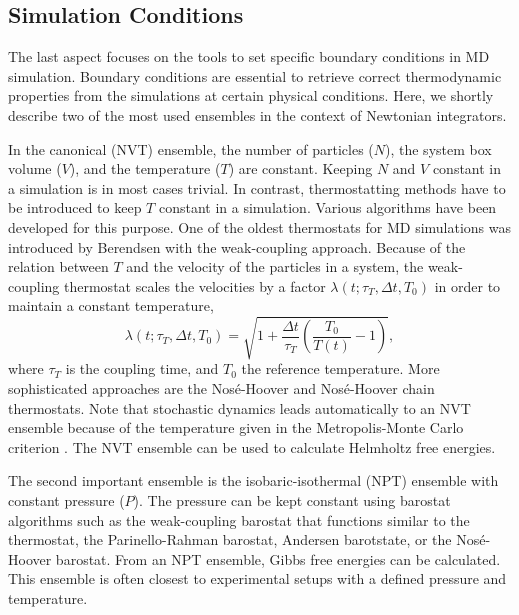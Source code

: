  
\subsection{Simulation Conditions}
The last aspect focuses on the tools to set specific boundary conditions in MD simulation. 
Boundary conditions are essential to retrieve correct thermodynamic properties from the simulations at certain physical conditions. Here, we shortly describe two of the most used ensembles in the context of Newtonian integrators.

In the canonical (NVT) ensemble, the number of particles ($N$), the system box volume ($V$), and the temperature ($T$) are constant. Keeping $N$ and $V$ constant in a simulation is in most cases trivial. In contrast, thermostatting methods have to be introduced to keep $T$ constant in a simulation.  Various algorithms have been developed for this purpose. One of the oldest thermostats for MD simulations was introduced by Berendsen\cite{Berendsen1984} with the weak-coupling approach. Because of the relation between $T$ and the velocity of the particles in a system, the weak-coupling thermostat scales the velocities by a factor $\lambda(t; \tau_T, \Delta t, T_0)$ in order to maintain a constant temperature,  
\begin{equation}
    \lambda(t; \tau_T, \Delta t, T_0) = \sqrt{1 + \frac{\Delta t}{\tau_{T}} \left( \frac{T_0}{T(t)}-1 \right) },
\end{equation}
where $\tau_{T}$ is the coupling time, and $T_{0}$ the reference temperature.\cite{Berendsen1984}
More sophisticated approaches are the Nos\'e-Hoover\cite{Nose1984, Nose1984A, Hoover1985} and Nos\'e-Hoover chain\cite{Martyna1992} thermostats. Note that stochastic dynamics leads automatically to an NVT ensemble because of the temperature given in the Metropolis-Monte Carlo criterion \cite{Hastings1970}. The NVT ensemble can be used to calculate Helmholtz free energies\cite{Helmholtz1882}.

The second important ensemble is the isobaric-isothermal (NPT) ensemble with constant pressure ($P$). The pressure can be kept constant using barostat algorithms such as the weak-coupling barostat\cite{Berendsen1984} that functions similar to the thermostat, the Parinello-Rahman barostat\cite{Parrinello1981}, Andersen barotstate\cite{Andersen1980}, or the Nos\'e-Hoover barostat\cite{Nose1983}. From an NPT ensemble, Gibbs free energies can be calculated\cite{Gibbs1879}. This ensemble is often closest to experimental setups with a defined pressure and temperature.

